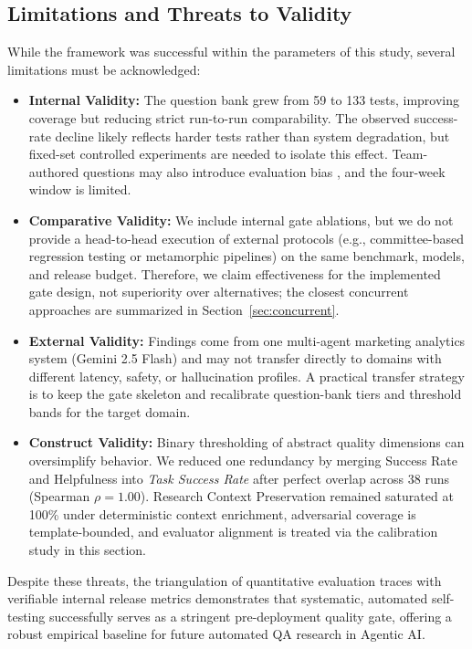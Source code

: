 \subsection{Limitations and Threats to Validity}
While the framework was successful within the parameters of this study, several limitations must be acknowledged:

\begin{itemize}
    \item \textbf{Internal Validity:} The question bank grew from 59 to 133 tests, improving coverage but reducing strict run-to-run comparability. The observed success-rate decline likely reflects harder tests rather than system degradation, but fixed-set controlled experiments are needed to isolate this effect. Team-authored questions may also introduce evaluation bias \cite{ribeiro2020beyond}, and the four-week window is limited.
    \item \textbf{Comparative Validity:} We include internal gate ablations, but we do not provide a head-to-head execution of external protocols (e.g., committee-based regression testing or metamorphic pipelines) on the same benchmark, models, and release budget. Therefore, we claim effectiveness for the implemented gate design, not superiority over alternatives; the closest concurrent approaches are summarized in Section~\ref{sec:concurrent}.
    \item \textbf{External Validity:} Findings come from one multi-agent marketing analytics system (Gemini 2.5 Flash) and may not transfer directly to domains with different latency, safety, or hallucination profiles. A practical transfer strategy is to keep the gate skeleton and recalibrate question-bank tiers and threshold bands for the target domain.
    \item \textbf{Construct Validity:} Binary thresholding of abstract quality dimensions can oversimplify behavior. We reduced one redundancy by merging Success Rate and Helpfulness into \textit{Task Success Rate} after perfect overlap across 38 runs (Spearman $\rho = 1.00$). Research Context Preservation remained saturated at 100\% under deterministic context enrichment, adversarial coverage is template-bounded, and evaluator alignment is treated via the calibration study in this section.
\end{itemize}

Despite these threats, the triangulation of quantitative evaluation traces with verifiable internal release metrics demonstrates that systematic, automated self-testing successfully serves as a stringent pre-deployment quality gate, offering a robust empirical baseline for future automated QA research in Agentic AI.
